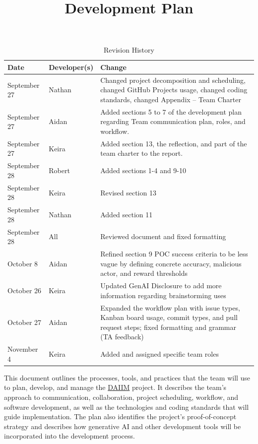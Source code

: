 \documentclass{article}
\title{Development Plan\\\progname}
\author{\authname}
\date{}
\begin{document}
\maketitle

\begin{table}[hp]
\caption{Revision History} \label{TblRevisionHistory}
\begin{tabularx}{\textwidth}{ll>{\raggedright\arraybackslash}X}
\toprule
\textbf{Date} & \textbf{Developer(s)} & \textbf{Change}\\
\midrule
September 27 & Nathan & Changed project decomposition and scheduling, changed GitHub Projects usage, changed coding standards, changed Appendix -- Team Charter\\
September 27 & Aidan & Added sections 5 to 7 of the development plan regarding Team communication plan, roles, and workflow. \\
September 27 & Keira & Added section 13, the reflection, and part of the team charter to the report. \\
September 28 & Robert & Added sections 1-4 and 9-10\\
September 28 & Keira & Revised section 13 \\
September 28 & Nathan & Added section 11 \\
September 28 & All & Reviewed document and fixed formatting \\
October 8 & Aidan & Refined section 9 POC success criteria to be less vague by defining concrete accuracy, malicious actor, and reward thresholds \\
October 26 & Keira & Updated GenAI Disclosure to add more information regarding brainstorming uses \\
October 27 & Aidan & Expanded the workflow plan with issue types, Kanban board usage, commit types, and pull request steps; fixed formatting and grammar (TA feedback) \\
November 4 & Keira & Added and assigned specific team roles \\
\bottomrule
\end{tabularx}
\end{table}

\newpage{}

This document outlines the processes, tools, and practices that the team will use to plan, develop, and manage the \href{https://github.com/robertLam04/daiim}{DAIIM} project. It describes the team's approach to communication, collaboration, project scheduling, workflow, and software development, as well as the technologies and coding standards that will guide implementation. The plan also identifies the project's proof-of-concept strategy and describes how generative AI and other development tools will be incorporated into the development process.
\end{document}

